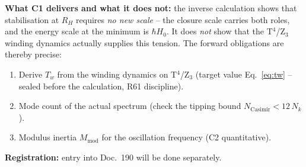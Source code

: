 \medskip
\noindent\textbf{What C1 delivers and what it does not:} the inverse
calculation shows that stabilisation at $R_H$ requires \emph{no new
scale} -- the closure scale carries both roles, and the energy scale
at the minimum is $\hbar H_0$. It does \emph{not} show that the
T$^4$/Z$_3$ winding dynamics actually supplies this tension. The
forward obligations are thereby precise:

\begin{enumerate}
  \item Derive $T_w$ from the winding dynamics on T$^4$/Z$_3$
        (target value Eq.~\eqref{eq:tw} -- sealed before the
        calculation, R61 discipline).
  \item Mode count of the actual spectrum (check the tipping bound
        $N_\text{Casimir} < 12\,N_k$).
  \item Modulus inertia $M_\text{mod}$ for the oscillation frequency
        (C2 quantitative).
\end{enumerate}

\noindent\textbf{Registration:} entry into Doc.~190 will be done
separately.



